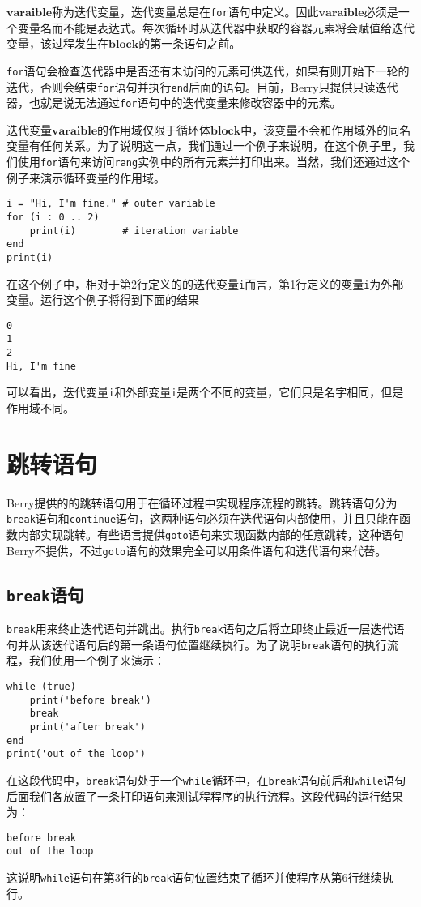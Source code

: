 $\bm{varaible}$称为迭代变量，迭代变量总是在\texttt{for}语句中定义。因此$\bm{varaible}$必须是一个变量名而不能是表达式。每次循环时从迭代器中获取的容器元素将会赋值给迭代变量，该过程发生在$\bm{block}$的第一条语句之前。

\texttt{for}语句会检查迭代器中是否还有未访问的元素可供迭代，如果有则开始下一轮的迭代，否则会结束\texttt{for}语句并执行\texttt{end}后面的语句。目前，Berry只提供只读迭代器，也就是说无法通过\texttt{for}语句中的迭代变量来修改容器中的元素。

迭代变量$\bm{varaible}$的作用域仅限于循环体$\bm{block}$中，该变量不会和作用域外的同名变量有任何关系。为了说明这一点，我们通过一个例子来说明，在这个例子里，我们使用\texttt{for}语句来访问\texttt{rang}实例中的所有元素并打印出来。当然，我们还通过这个例子来演示循环变量的作用域。
\begin{lstlisting}[language=berry]
i = "Hi, I'm fine." # outer variable
for (i : 0 .. 2)
    print(i)        # iteration variable
end
print(i)
\end{lstlisting}

在这个例子中，相对于第2行定义的的迭代变量\texttt{i}而言，第1行定义的变量\texttt{i}为外部变量。运行这个例子将得到下面的结果
\begin{lstlisting}[numbers=none]
0
1
2
Hi, I'm fine
\end{lstlisting}
可以看出，迭代变量\texttt{i}和外部变量\texttt{i}是两个不同的变量，它们只是名字相同，但是作用域不同。

\section{跳转语句}

Berry提供的的跳转语句用于在循环过程中实现程序流程的跳转。跳转语句分为\texttt{break}语句和\texttt{continue}语句，这两种语句必须在迭代语句内部使用，并且只能在函数内部实现跳转。有些语言提供\texttt{goto}语句来实现函数内部的任意跳转，这种语句Berry不提供，不过\texttt{goto}语句的效果完全可以用条件语句和迭代语句来代替。

\subsection{\texttt{break}语句}

\texttt{break}用来终止迭代语句并跳出。执行\texttt{break}语句之后将立即终止最近一层迭代语句并从该迭代语句后的第一条语句位置继续执行。为了说明\texttt{break}语句的执行流程，我们使用一个例子来演示：
\begin{lstlisting}[language=berry]
while (true)
    print('before break')
    break
    print('after break')
end
print('out of the loop')
\end{lstlisting}
在这段代码中，\texttt{break}语句处于一个\texttt{while}循环中，在\texttt{break}语句前后和\texttt{while}语句后面我们各放置了一条打印语句来测试程程序的执行流程。这段代码的运行结果为：
\begin{lstlisting}[numbers=none]
before break
out of the loop
\end{lstlisting}
这说明\texttt{while}语句在第3行的\texttt{break}语句位置结束了循环并使程序从第6行继续执行。

